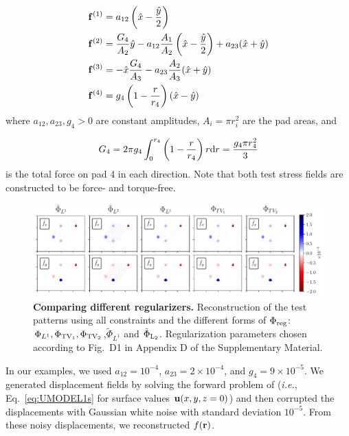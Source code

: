\documentclass[aps,prl,reprint,groupedaddress,twocolumn]{revtex4-1}
\def\dd{\mbox{d}}
\def\f{{\bf f}}
\def\r{{\bf r}}
\def\u{{\bf u}}
\begin{document}
\begin{align}
\f^{(1)} & = a_{12}\left(\hat{x} -{\hat{y}\over 2}\right) \label{SIGMA1}\\
\f^{(2)} & = {G_{4}\over A_{2}}\hat{y} - a_{12}{A_{1}\over A_{2}}\left(\hat{x} 
-{\hat{y}\over 2}\right) + a_{23}(\hat{x}+\hat{y}) \label{SIGMA2} \\
\f^{(3)} & = -\hat{x}{G_{4}\over A_{3}} - a_{23}{A_{2}\over A_{3}}(\hat{x}+\hat{y}) 
\label{SIGMA3}\\
\f^{(4)} & = g_{4}\left(1- {r \over r_{4}}\right)(\hat{x}-\hat{y})\label{SIGMA4}
\end{align}
%
where $a_{12}, a_{23}, g_{4} >0$ are constant amplitudes, 
$A_{i} = \pi r_{i}^{2}$ are the pad areas, and 

\begin{equation}
G_{4} = 2\pi g_{4}\int_{0}^{r_{4}}\left(1-{r\over r_{4}}\right)r\dd r = {g_{4}\pi r_{4}^{2}\over 3}
\end{equation}
%
is the total force on pad 4 in each direction. Note that both test
stress fields are constructed to be force- and torque-free.

\begin{figure}
\includegraphics[width=\linewidth]{fig3_landscape_side}
\caption{\textbf{Comparing different regularizers.} Reconstruction of
  the test patterns using all constraints and the different forms of
  $\Phi_{\rm reg}$: $\Phi_{L^{1}},\Phi_{{\rm TV}_1},\Phi_{{\rm
      TV}_2}$,$\tilde{\Phi}_{L^{1}}$ and $\tilde{\Phi}_{\rm
    {L}_{2}}$. Regularization parameters chosen according to
  Fig.~D1 in Appendix D of the Supplementary Material.}
\label{COMPARE}
\end{figure}
%

In our examples, we used $a_{12} = 10^{-4}$, $a_{23} =
2\times10^{-4}$, and $g_4 = 9\times10^{-5}$.  We generated
displacement fields by solving the forward problem of (\textit{i.e.},
Eq.~\ref{eq:UMODEL1s} for surface values $\u(x,y,z=0)$) and then
corrupted the displacements with Gaussian white noise with standard
deviation $10^{-5}$. From these noisy displacements, we reconstructed
$f(\r)$.
\end{document}
